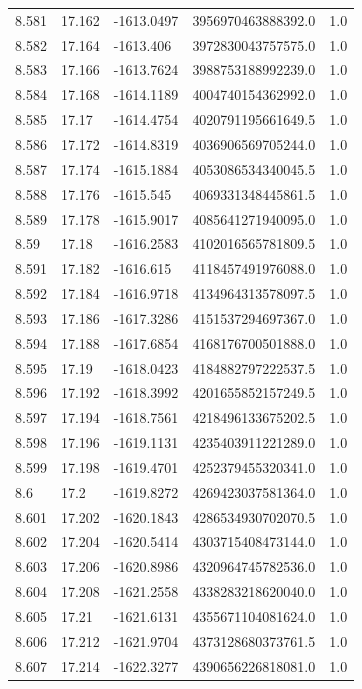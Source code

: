 \begin{tabular}{lllll}
8.581 & 17.162 & -1613.0497 & 3956970463888392.0 & 1.0 \\
8.582 & 17.164 & -1613.406 & 3972830043757575.0 & 1.0 \\
8.583 & 17.166 & -1613.7624 & 3988753188992239.0 & 1.0 \\
8.584 & 17.168 & -1614.1189 & 4004740154362992.0 & 1.0 \\
8.585 & 17.17 & -1614.4754 & 4020791195661649.5 & 1.0 \\
8.586 & 17.172 & -1614.8319 & 4036906569705244.0 & 1.0 \\
8.587 & 17.174 & -1615.1884 & 4053086534340045.5 & 1.0 \\
8.588 & 17.176 & -1615.545 & 4069331348445861.5 & 1.0 \\
8.589 & 17.178 & -1615.9017 & 4085641271940095.0 & 1.0 \\
8.59 & 17.18 & -1616.2583 & 4102016565781809.5 & 1.0 \\
8.591 & 17.182 & -1616.615 & 4118457491976088.0 & 1.0 \\
8.592 & 17.184 & -1616.9718 & 4134964313578097.5 & 1.0 \\
8.593 & 17.186 & -1617.3286 & 4151537294697367.0 & 1.0 \\
8.594 & 17.188 & -1617.6854 & 4168176700501888.0 & 1.0 \\
8.595 & 17.19 & -1618.0423 & 4184882797222537.5 & 1.0 \\
8.596 & 17.192 & -1618.3992 & 4201655852157249.5 & 1.0 \\
8.597 & 17.194 & -1618.7561 & 4218496133675202.5 & 1.0 \\
8.598 & 17.196 & -1619.1131 & 4235403911221289.0 & 1.0 \\
8.599 & 17.198 & -1619.4701 & 4252379455320341.0 & 1.0 \\
8.6 & 17.2 & -1619.8272 & 4269423037581364.0 & 1.0 \\
8.601 & 17.202 & -1620.1843 & 4286534930702070.5 & 1.0 \\
8.602 & 17.204 & -1620.5414 & 4303715408473144.0 & 1.0 \\
8.603 & 17.206 & -1620.8986 & 4320964745782536.0 & 1.0 \\
8.604 & 17.208 & -1621.2558 & 4338283218620040.0 & 1.0 \\
8.605 & 17.21 & -1621.6131 & 4355671104081624.0 & 1.0 \\
8.606 & 17.212 & -1621.9704 & 4373128680373761.5 & 1.0 \\
8.607 & 17.214 & -1622.3277 & 4390656226818081.0 & 1.0 \\

\end{tabular}

